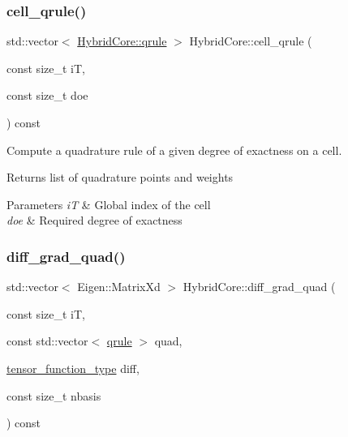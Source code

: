 \subsubsection{\texorpdfstring{cell\+\_\+qrule()}{cell\_qrule()}}
{\footnotesize\ttfamily std\+::vector$<$ \hyperlink{structHCore2D_1_1HybridCore_1_1qrule}{Hybrid\+Core\+::qrule} $>$ Hybrid\+Core\+::cell\+\_\+qrule (\begin{DoxyParamCaption}\item[{const size\+\_\+t}]{iT,  }\item[{const size\+\_\+t}]{doe }\end{DoxyParamCaption}) const}



Compute a quadrature rule of a given degree of exactness on a cell. 

\begin{DoxyReturn}{Returns}
list of quadrature points and weights 
\end{DoxyReturn}

\begin{DoxyParams}{Parameters}
{\em iT} & Global index of the cell \\
\hline
{\em doe} & Required degree of exactness \\
\hline
\end{DoxyParams}
\mbox{\label{classHCore2D_1_1HybridCore_ae0349043d1db479a70f7827cd9181657}} 
\subsubsection{\texorpdfstring{diff\+\_\+grad\+\_\+quad()}{diff\_grad\_quad()}}
{\footnotesize\ttfamily std\+::vector$<$ Eigen\+::\+Matrix\+Xd $>$ Hybrid\+Core\+::diff\+\_\+grad\+\_\+quad (\begin{DoxyParamCaption}\item[{const size\+\_\+t}]{iT,  }\item[{const std\+::vector$<$ \hyperlink{structHCore2D_1_1HybridCore_1_1qrule}{qrule} $>$}]{quad,  }\item[{\hyperlink{classHCore2D_1_1HybridCore_acf40d06e50a33dbb42cc4e1e3b0529b5}{tensor\+\_\+function\+\_\+type}}]{diff,  }\item[{const size\+\_\+t}]{nbasis }\end{DoxyParamCaption}) const}



